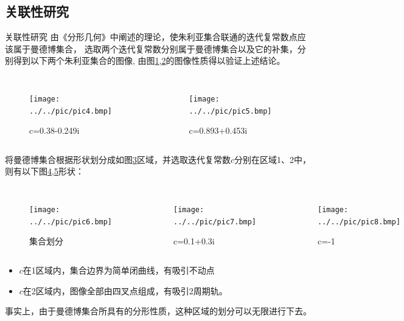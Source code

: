 \documentclass[8pt,c,compress,UTF8]{beamer}
\begin{document}
\subsection{关联性研究}
\begin{frame}{关联性研究}
由《分形几何》\cite{1997Techniques}中阐述的理论，使朱利亚集合联通的迭代复常数点应该属于曼德博集合，
选取两个迭代复常数分别属于曼德博集合以及它的补集，分别得到以下两个朱利亚集合的图像,
由图\ref{pic::4},\ref{pic::5}的图像性质得以验证上述结论。
\begin{columns}
    \begin{figure}[H]
        \centering
        \texttt{[image: ../../pic/pic4.bmp]}
        \caption{c=0.38-0.249i}
        \label{pic::4}
    \end{figure}

    \begin{figure}[H] 
    \centering 
    \texttt{[image: ../../pic/pic5.bmp]} 
    \caption{c=0.893+0.453i} 
    \label{pic::5}
    \end{figure}
\end{columns}

将曼德博集合根据形状划分成如图\ref{pic::6}区域，并选取迭代复常数$c$分别在区域1、2中，
则有以下图\ref{pic::7},\ref{pic::8}形状：


\begin{columns}
    \begin{figure}[H]
        \centering
        \texttt{[image: ../../pic/pic6.bmp]}
        \caption{集合划分}
        \label{pic::6}
    \end{figure}

    \begin{figure}[H] 
    \centering 
    \texttt{[image: ../../pic/pic7.bmp]} 
    \caption{c=0.1+0.3i} 
    \label{pic::7}
    \end{figure}

    \begin{figure}[H] 
    \centering 
    \texttt{[image: ../../pic/pic8.bmp]} 
    \caption{c=-1} 
    \label{pic::8}
    \end{figure}
\end{columns}

\begin{itemize}
    \setlength{\itemsep}{1pt}
    \item $c$在1区域内，集合边界为简单闭曲线，有吸引不动点
    \item $c$在2区域内，图像全部由四叉点组成，有吸引2周期轨。
\end{itemize}
事实上，由于曼德博集合所具有的分形性质，这种区域的划分可以无限进行下去。

\end{frame}
\end{document}
